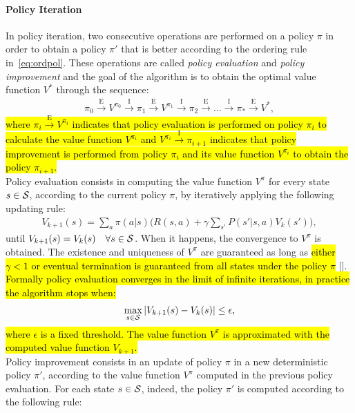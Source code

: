 \paragraph{Policy Iteration}
In policy iteration, two consecutive operations are performed on a policy $\pi$ in order to obtain a policy $\pi'$ that is better according to the ordering rule in~\eqref{eq:ordpol}. These operations are called \emph{policy evaluation} and \emph{policy improvement} and the goal of the algorithm is to obtain the optimal value function $V^{*}$ through the sequence:
\begin{align}
\pi_{0} \xrightarrow{\text{E}} V^{\pi_{0}} \xrightarrow{\text{I}} \pi_{1} \xrightarrow{\text{E}} V^{\pi_{1}} \xrightarrow{\text{I}} \pi_{2} \xrightarrow{\text{E}} ... \xrightarrow{\text{I}} \pi_{*} \xrightarrow{\text{E}} V^{*},
\end{align}
\hl{where $\pi_{i} \xrightarrow{\text{E}} V^{\pi_{i}}$ indicates that policy evaluation is performed on policy $\pi_{i}$ to calculate the value function $V^{\pi_{i}}$ and $V^{\pi_{i}} \xrightarrow{\text{I}} \pi_{i+1}$ indicates that policy improvement is performed from policy $\pi_{i}$ and its value function $V^{\pi_{i}}$ to obtain the policy $\pi_{i+1}$.}\\
\newline
Policy evaluation consists in computing the value function $V^{\pi}$ for every state $s \in \mathcal{S}$, according to the current policy $\pi$, by iteratively applying the following updating rule:
\begin{align} V_{k+1}(s) = \sum_{a}\pi(a|s) \Big( R(s,a) + \gamma \sum_{s'}P(s'|s,a) V_{k}(s') \Big), \label{eq:updrule} \end{align}
until $V_{k+1}(s) = V_{k}(s) \quad \forall s \in \mathcal{S}$. When it happens, the convergence to $V^{\pi}$ is obtained. The existence and uniqueness of $V^{\pi}$ are guaranteed as long as \hl{either $\gamma<1$ or eventual termination is guaranteed from all states under the policy $\pi$} [\cite{sutton2018reinforcement}]. \hl{Formally policy evaluation converges in the limit of infinite iterations, in practice the algorithm stops when:}
\begin{align}
	\max_{s \in \mathcal{S}}|V_{k+1}(s) - V_{k}(s)| \leq \epsilon, \label{eq:stopcond}
\end{align}
\hl{where $\epsilon$ is a fixed threshold. The value function $V^{\pi}$ is approximated with the computed value function $V_{k+1}$.}\\
\newline
Policy improvement consists in an update of policy $\pi$ in a new deterministic policy $\pi'$, according to the value function $V^{\pi}$ computed in the previous policy evaluation. For each state $s \in \mathcal{S}$, indeed, the policy $\pi'$ is computed according to the following rule:
